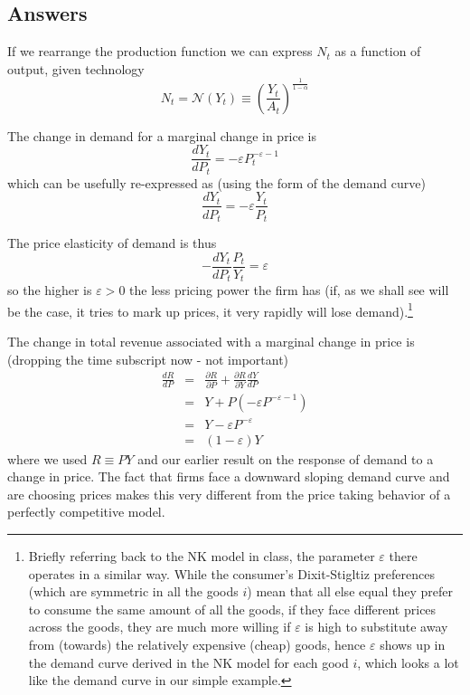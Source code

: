 \documentclass[authoryear,11pt]{elsarticle}
\begin{document}
\subsection*{Answers}
If we rearrange the production function we can express $N_{t}$ as a function of output, given technology
\[
N_{t} = \mathcal{N}(Y_{t}) \equiv \left( \frac{Y_{t}}{A_{t}} \right)^{\frac{1}{1-\alpha}}
\]

The change in demand for a marginal change in price is
\[
\frac{dY_{t}}{dP_{t}} = -\varepsilon P_{t}^{-\varepsilon - 1}
\]
which can be usefully re-expressed as (using the form of the demand curve)
\[
\frac{dY_{t}}{dP_{t}}  = -\varepsilon \frac{Y_{t}}{P_{t}}
\]

The price elasticity of demand is thus
\[
-\frac{dY_{t}}{dP_{t}} \frac{P_{t}}{Y_{t}} = \varepsilon
\]
so the higher is $\varepsilon>0$ the less pricing power the firm has (if, as we shall see will be the case, it tries to mark up prices, it very rapidly will lose demand).\footnote{Briefly referring back to the NK model in class, the parameter $\varepsilon$ there operates in a similar way. While the consumer's Dixit-Stigltiz preferences (which are symmetric in all the goods $i$) mean that all else equal they prefer to consume the same amount of all the goods, if they face different prices across the goods, they are much more willing if $\varepsilon$ is high to substitute away from (towards) the relatively expensive (cheap) goods, hence $\varepsilon$ shows up in the demand curve derived in the NK model for each good $i$, which looks a lot like the demand curve in our simple example.}

The change in total revenue associated with a marginal change in price is (dropping the time subscript now - not important)
\begin{eqnarray*}
\frac{dR}{dP} 	&=& \frac{\partial R}{\partial P} + \frac{\partial R}{\partial Y} \frac{dY}{dP} \\
				&=& Y + P(-\varepsilon P^{-\varepsilon - 1}) \\
				&=& Y - \varepsilon P^{-\varepsilon} \\
				&=& (1-\varepsilon)Y
\end{eqnarray*}
where we used $R\equiv PY$ and our earlier result on the response of demand to a change in price. The fact that firms face a downward sloping demand curve and are choosing prices makes this very different from the price taking behavior of a perfectly competitive model.
\end{document}
